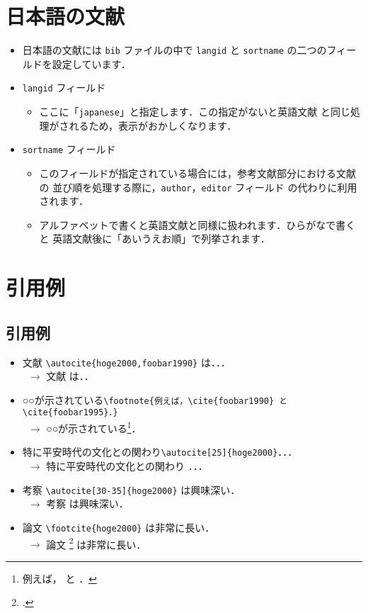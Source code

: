 
\section{日本語の文献}

\begin{itemize}
 \item 日本語の文献には \texttt{bib} ファイルの中で  \texttt{langid} と
       \texttt{sortname} の二つのフィールドを設定しています．
 \item \texttt{langid} フィールド
       \begin{itemize}
        \item ここに「\texttt{japanese}」と指定します．この指定がないと英語文献
              と同じ処理がされるため，表示がおかしくなります．
       \end{itemize}
 \item \texttt{sortname} フィールド
       \begin{itemize}
        \item このフィールドが指定されている場合には，参考文献部分における文献の
              並び順を処理する際に，\texttt{author}，\texttt{editor} フィールド
              の代わりに利用されます．
        \item アルファベットで書くと英語文献と同様に扱われます．ひらがなで書くと
              英語文献後に「あいうえお順」で列挙されます．
       \end{itemize}
\end{itemize}

\section{引用例}

\subsection{引用例}

\begin{itemize}
 \item 文献 \verb|\autocite{hoge2000,foobar1990}| は．．． \\
       \ $\rightarrow$ 文献 \autocite{hoge2000,foobar1990} は．．
 \item ○○が示されている\verb|\footnote{例えば，\cite{foobar1990} と \cite{foobar1995}．}| \\
       \ $\rightarrow$ ○○が示されている\footnote{例えば，\cite{foobar1990} と \cite{foobar1995}．}．
 \item 特に平安時代の文化との関わり\verb|\autocite[25]{hoge2000}|．．．\\
       \ $\rightarrow$ 特に平安時代の文化との関わり \autocite[25]{hoge2000}．．．
 \item 考察 \verb|\autocite[30-35]{hoge2000}| は興味深い．\\
       \ $\rightarrow$ 考察 \autocite[30-35]{hoge2000} は興味深い．
 \item 論文 \verb|\footcite{hoge2000}| は非常に長い．\\
       \ $\rightarrow$ 論文 \footcite{hoge2000} は非常に長い．
\end{itemize}

